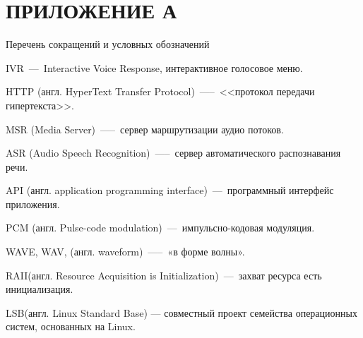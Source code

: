 \chapter{ПРИЛОЖЕНИЕ А}
\begin{center}
    Перечень сокращений и условных обозначений
\end{center}

\hypertarget{ivr}{IVR~---~Interactive Voice Response, интерактивное голосовое меню.}

\hypertarget{http}{HTTP (англ. HyperText Transfer Protocol)~—--~<<протокол передачи \\ \mbox{гипертекста}>>.}

\hypertarget{msr}{MSR (Media Server)~—--~сервер маршрутизации аудио потоков.}

\hypertarget{asr}{ASR (Audio Speech Recognition)~—--~сервер автоматического распознавания речи.}

\hypertarget{api}{API (англ. application programming interface)~---~программный интерфейс приложения.}

\hypertarget{pcm}{PCM (англ. Pulse-code modulation)~---~импульсно-кодовая модуляция.}

\hypertarget{wav}{WAVE, WAV, (англ. waveform)~—--~«в форме волны».}

\hypertarget{raii}{RAII(англ. Resource Acquisition is Initialization)~---~захват ресурса есть инициализация.}

\hypertarget{lsb}{LSB(англ. Linux Standard Base) — совместный проект семейства операционных систем, основанных на Linux.}

\clearpage
